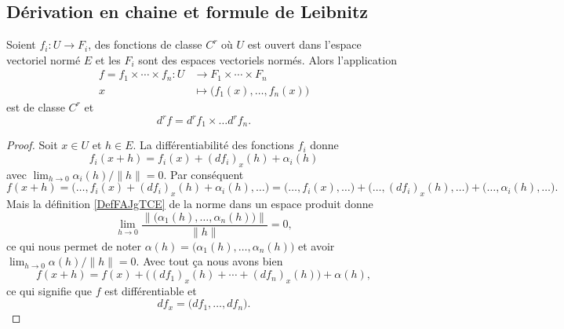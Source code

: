 \subsection{Dérivation en chaine et formule de Leibnitz}

\begin{proposition} \label{PropOYtgIua}
    Soient \( f_i\colon U\to F_i\), des fonctions de classe \( C^r\) où \( U\) est ouvert dans l'espace vectoriel normé \( E\) et les \( F_i\) sont des espaces vectoriels normés. Alors l'application
    \begin{equation}
        \begin{aligned}
        f=f_1\times \cdots\times f_n\colon U&\to F_1\times \cdots\times F_n \\
    x&\mapsto \big( f_1(x),\ldots, f_n(x) \big) 
        \end{aligned}
    \end{equation}
    est de classe \( C^r\) et
    \begin{equation}
    d^rf=d^rf_1\times\ldots d^rf_n.
    \end{equation}
\end{proposition}

\begin{proof}
    Soit \( x\in U\) et \( h\in E\). La différentiabilité des fonctions \( f_i\) donne
    \begin{equation}
        f_i(x+h)=f_i(x)+(df_i)_x(h)+\alpha_i(h)
    \end{equation}
    avec \( \lim_{h\to 0} \alpha_i(h)/\| h \|=0\). Par conséquent
    \begin{equation}
        f(x+h)=\big( \ldots, f_i(x)+(df_i)_x(h)+\alpha_i(h),\ldots \big)= \big( \ldots,f_i(x),\ldots \big)+ \big( \ldots,(df_i)_x(h),\ldots \big)+ \big( \ldots,\alpha_i(h),\ldots \big).
    \end{equation}
    Mais la définition \ref{DefFAJgTCE} de la norme dans un espace produit donne
    \begin{equation}
        \lim_{h\to 0} \frac{ \| \big( \alpha_1(h),\ldots, \alpha_n(h) \big) \| }{ \| h \| }=0,
    \end{equation}
    ce qui nous permet de noter \( \alpha(h)=\big( \alpha_1(h),\ldots, \alpha_n(h) \big)\) et avoir \( \lim_{h\to 0} \alpha(h)/\| h \|=0\). Avec tout ça nous avons bien
    \begin{equation}
        f(x+h)=f(x)+\big( (df_1)_x(h)+\cdots +(df_n)_x(h) \big)+\alpha(h),
    \end{equation}
    ce qui signifie que \( f\) est différentiable et
    \begin{equation}
        df_x=\big( df_1,\ldots, df_n \big).
    \end{equation}
\end{proof}

